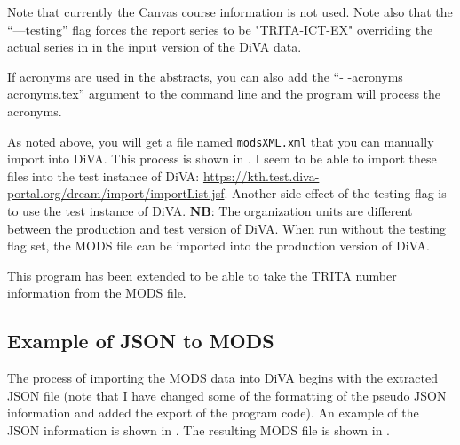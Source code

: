 Note that currently the Canvas course information is not used. Note also that the “—testing” flag forces the report series to be  "TRITA-ICT-EX" overriding the actual series in in the input version of the DiVA data.

If acronyms are used in the abstracts, you can also add the “- -acronyms acronyms.tex” argument to the command line and the program will process the acronyms.

As noted above, you will get a file named \texttt{modsXML.xml} that you can manually import into DiVA. This process is shown in . I seem to be able to import these files into the test instance of DiVA:	\url{https://kth.test.diva-portal.org/dream/import/importList.jsf}. Another side-effect of the testing flag is to use the test instance of DiVA. \textbf{NB}: The organization units are different between the production and test version of DiVA. When run without the testing flag set, the MODS file can be imported into the production version of DiVA.

This program has been extended to be able to take the TRITA number information from the MODS file.


\subsection{Example of JSON to MODS}
The process of importing the MODS data into DiVA begins with the extracted JSON file (note that I have changed some of the formatting of the pseudo JSON information and added the export of the program code). An example of the JSON information is shown in . The resulting MODS file is shown in .


